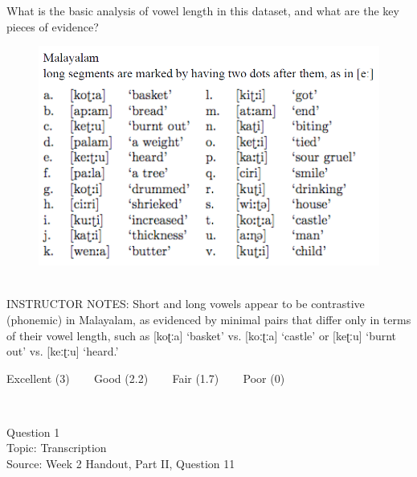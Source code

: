 \documentclass[12pt]{article}
\begin{document}
What is the basic analysis of vowel length in this dataset, and what are the key pieces of evidence?\\

\begin{figure}[H]
\includegraphics{../images/malayalam.png}
\end{figure}

~\\
INSTRUCTOR NOTES: Short and long vowels appear to be contrastive (phonemic) in Malayalam, as evidenced by minimal pairs that differ only in terms of their vowel length, such as [koʈːa] ‘basket’ vs. [koːʈːa] ‘castle’ or [keʈːu] ‘burnt out’ vs. [keːʈːu] ‘heard.’


\vfill
Excellent (3) ~~~ Good (2.2) ~~~ Fair (1.7) ~~~ Poor (0)
\newpage

\begin{center}
\textbf{{\color{red}{\HUGE END OF EXAM}}}\\

\end{center}
\newpage

\begin{center}
\textbf{{\color{blue}{\HUGE START OF EXAM\\}}}

\textbf{{\color{blue}{\HUGE Student ID: 16922\\}}}

\textbf{{\color{blue}{\HUGE \\}}}

\end{center}
\newpage

{\large Question 1}\\

Topic: Transcription\\
Source: Week 2 Handout, Part II, Question 11\\
\end{document}
